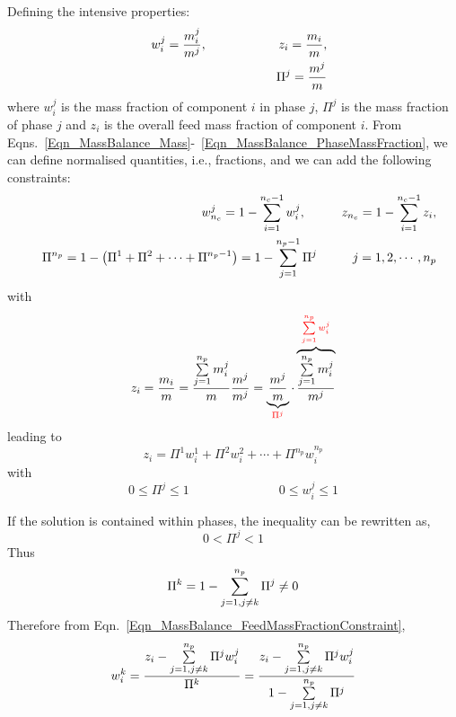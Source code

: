 Defining the intensive properties:
\begin{eqnarray}
&& w_{i}^{j} = \displaystyle\frac{m_{i}^{j}}{m^{j}}, \hspace{2cm} z_{i} = \displaystyle\frac{m_{i}}{m},\label{Eqn_MassBalance_MassFraction} \\
&& \Pi^{j} = \displaystyle\frac{m^{j}}{m}\label{Eqn_MassBalance_PhaseMassFraction} 
\end{eqnarray}
where $w_{i}^{j}$ is the mass fraction of component $i$ in phase $j$, $\Pi^{j}$ is the mass fraction of phase $j$ and $z_{i}$ is the overall feed mass fraction of component $i$. From Eqns.~\ref{Eqn_MassBalance_Mass}-~\ref{Eqn_MassBalance_PhaseMassFraction}, we can define normalised quantities, i.e., fractions, and we can add the following constraints:
\begin{eqnarray}
&&w_{n_{c}}^{j} = 1 - \sum\limits_{i=1}^{n_{c}-1}w_{i}^{j},\hspace{1cm}  z_{n_{c}} = 1 - \sum\limits_{i=1}^{n_{c}-1}z_{i},  \label{Eqn_MassBalance_MassFraction2} \\
&&\Pi^{n_{p}} = 1 - \left(\Pi^{1} + \Pi^{2} + \cdots + \Pi^{n_{p}-1}\right) = 1 - \sum\limits_{j=1}^{n_{p}-1} \Pi^{j}\hspace{1cm} j=1,2,\cdots,n_{p} \label{Eqn_MassBalance_PhaseMassFraction2}
\end{eqnarray} 
with
\begin{displaymath}
  z_{i} = \displaystyle\frac{m_{i}}{m} = \displaystyle\frac{\sum\limits_{j=1}^{n_{p}}m_{i}^{j}}{m} \displaystyle\frac{m^{j}}{m^{j}} = \underbrace{\displaystyle\frac{m^{j}}{m}}_{\textcolor{red}{\Pi^{j}}} \cdot \overbrace{\displaystyle\frac{\sum\limits_{j=1}^{n_{p}}m_{i}^{j}}{m^{j}}}^{\textcolor{red}{\sum\limits_{j=1}^{n_{p}}w_{i}^{j}}} 
\end{displaymath}
leading to
\begin{equation}
z_{i} = \Pi^{1}w_{i}^{1} + \Pi^{2}w_{i}^{2} + \cdots + \Pi^{n_{p}}w_{i}^{n_{p}}
\label{Eqn_MassBalance_FeedMassFractionConstraint}
\end{equation}
with
\begin{equation}
0\leq\Pi^{j}\leq 1 \hspace{3cm} 0\leq w_{i}^{j}\leq 1
\end{equation}

If the solution is contained within  phases, the inequality can be rewritten as,
\begin{equation} 
0 < \Pi^{j} < 1
\end{equation}
Thus
\begin{displaymath}
\Pi^{k} = 1 - \sum\limits_{j=1,j\neq k}^{n_{p}} \Pi^{j} \neq 0
\end{displaymath}
Therefore from Eqn.~\ref{Eqn_MassBalance_FeedMassFractionConstraint},
\begin{equation}
w_{i}^{k} = \displaystyle\frac{z_{i}-\sum\limits_{j=1,j\neq k}^{n_{p}}\Pi^{j}w_{i}^{j}}{\Pi^{k}} = \displaystyle\frac{z_{i} - \sum\limits_{j=1,j\neq k}^{n_{p}}\Pi^{j}w_{i}^{j}}{1-\sum\limits_{j=1,j\neq k}^{n_{p}}\Pi^{j}}
\label{Eqn_MassBalance_FeedMassFractionConstraint2}
\end{equation}


